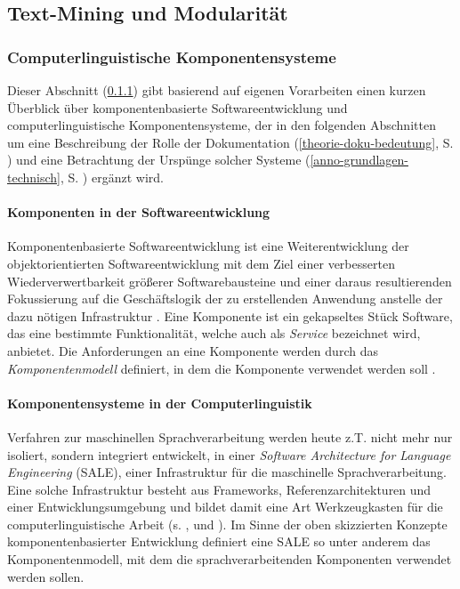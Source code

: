 \documentclass[abstracton, 12pt]{scrartcl}
\begin{document}
\subsection{Text-Mining und Modularität} \label{ml-mod}

\subsubsection{Computerlinguistische Komponentensysteme} \label{sale-theorie}

Dieser Abschnitt (\ref{sale-theorie}) gibt basierend auf eigenen Vorarbeiten \citep{Steeg2007} einen kurzen Überblick über komponentenbasierte Softwareentwicklung und computerlinguistische Komponentensysteme, der in den folgenden Abschnitten um eine Beschreibung der Rolle der Dokumentation (\ref{theorie-doku-bedeutung}, S. \pageref{theorie-doku-bedeutung}) und eine Betrachtung der Urspünge solcher Systeme (\ref{anno-grundlagen-technisch}, S. \pageref{anno-grundlagen-technisch}) ergänzt wird.

\paragraph{Komponenten in der Softwareentwicklung}  

Komponentenbasierte Software\-entwickl\-ung ist eine Wei\-ter\-ent\-wick\-l\-ung der objektorientierten Softwareentwicklung mit dem Ziel einer verbesserten Wiederverwertbarkeit größerer Softwarebausteine und einer daraus resultierenden Fokussierung auf die Geschäfts\-logik der zu erstellenden Anwendung anstelle der dazu nötigen Infrastruktur \citep[1]{GruhnAndThiel2000}. Eine Komponente ist ein gekapseltes Stück Software, das eine bestimmte Funktionalität, welche auch als \emph{Service} bezeichnet wird, anbietet. Die Anforderungen an eine Komponente werden durch das \emph{Komponentenmodell} definiert, in dem die Komponente verwendet werden soll \citep[15-6]{GruhnAndThiel2000}. 

\paragraph{Komponentensysteme in der Computerlinguistik} \label{theorie-sale}


Verfahren zur maschinellen Sprachverarbeitung werden heute z.T. nicht mehr nur isoliert, sondern integriert entwickelt, in einer \emph{Software Architecture for Language Engineering} (SALE), einer Infrastruktur für die maschinelle Sprachverarbeitung. Eine solche Infrastruktur besteht aus Frameworks, Referenzarchitekturen und einer Entwicklungsumgebung und bildet damit eine Art Werkzeugkasten für die computerlinguistische Arbeit (s. \citealt{Koehler2005, CunninghamAndBontcheva2006}, und \citealt{Ziegler2007}). Im Sinne der oben skizzierten Konzepte komponentenbasierter Entwicklung definiert eine SALE so unter anderem das Komponentenmodell, mit dem die sprachverarbeitenden Komponenten verwendet werden sollen.
\end{document}

